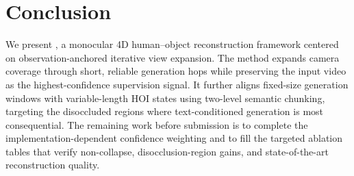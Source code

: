 \section{Conclusion}
\label{sec:conclusion}
We present \textbf{\ourmethod}, a monocular 4D human--object reconstruction framework centered on observation-anchored iterative view expansion.
The method expands camera coverage through short, reliable generation hops while preserving the input video as the highest-confidence supervision signal.
It further aligns fixed-size generation windows with variable-length HOI states using two-level semantic chunking, targeting the disoccluded regions where text-conditioned generation is most consequential.
The remaining work before submission is to complete the implementation-dependent confidence weighting and to fill the targeted ablation tables that verify non-collapse, disocclusion-region gains, and state-of-the-art reconstruction quality.
